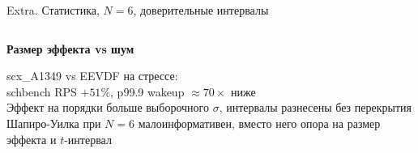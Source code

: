 \documentclass[aspectratio=169,11pt]{beamer}
\begin{document}
\begin{frame}{Extra. Статистика, $N=6$, доверительные интервалы}
\begin{columns}[T]
                \begin{shadowbox2}
                        \textbf{Размер эффекта vs шум}

                        \scriptsize
                        scx\_A1349 vs EEVDF на стрессе:\\
                        schbench RPS $+51\%$, p99.9 wakeup $\approx
                        70\times$ ниже\\[0.15em]
                        Эффект на порядки больше выборочного
                        $\sigma$, интервалы разнесены без
                        перекрытия\\[0.15em]
                        Шапиро-Уилка при $N = 6$ малоинформативен,
                        вместо него опора на размер эффекта и
                        $t$-интервал
                \end{shadowbox2}
        \end{columns}
\end{frame}
\addtocounter{framenumber}{-1}
\end{document}

